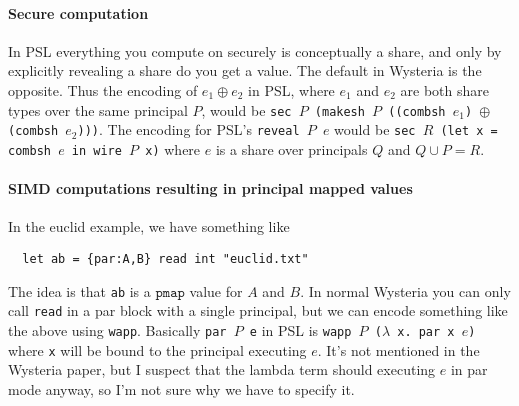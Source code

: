 \documentclass[10pt]{article}
\newcommand{\isec}{\ensuremath{\mathtt{pmap}}}
\begin{document}
\paragraph{Secure computation} In PSL everything you compute on
securely is conceptually a share, and only by explicitly revealing a
share do you get a value. The default in Wysteria is the
opposite. Thus the encoding of $e_1 \oplus e_2$ in PSL, where $e_1$
and $e_2$ are both share types over the same principal $P$, would be
\texttt{sec $P$ (makesh $P$ ((combsh $e_1$) $\oplus$ (combsh
  $e_2$)))}. The encoding for PSL's \texttt{reveal $P$ $e$} would be
\texttt{sec $R$ (let x = combsh $e$ in wire $P$ x)} where $e$ is
a share over principals $Q$ and $Q \cup P = R$. 

\paragraph{SIMD computations resulting in principal mapped values} In
the euclid example, we have something like
\begin{verbatim}
  let ab = {par:A,B} read int "euclid.txt"
\end{verbatim}
The idea is that \verb+ab+ is a $\isec$ value for $A$ and $B$. In
normal Wysteria you can only call \texttt{read} in a par block with a
single principal, but we can encode something like the above using
\texttt{wapp}. Basically \texttt{par $P$ e} in PSL is \texttt{wapp $P$
  ($\lambda$ x. par x $e$)} where \texttt{x} will be bound to the principal
executing $e$. It's not mentioned in the Wysteria paper, but I suspect
that the lambda term should executing $e$ in par mode anyway, so I'm
not sure why we have to specify it.
\end{document}
